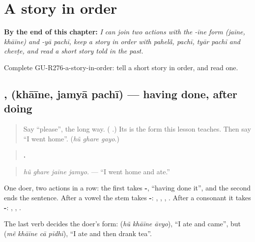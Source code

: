 
\chapter{A story in order}
\label{ch:gu-a-story-in-order}

\begin{chapteropening}
\textbf{By the end of this chapter:} \emph{I can join two actions with the -īne form (jaīne, khāīne) and -yā pachī, keep a story in order with pahelā̃, pachī, tyār pachī and chevṭe, and read a short story told in the past.}

Complete GU-R276-a-story-in-order: tell a short story in order, and read one.
\end{chapteropening}

\section[\texorpdfstring{\gu{ખાઈને} · \gu{જમ્યા} \gu{પછી} (khāīne · jamyā pachī)}{ખાઈને · જમ્યા પછી (khāīne · jamyā pachī)}]{,   (khāīne, jamyā pachī) — having done, after doing}

\label{lesson:GU-C276-khaine}



\begin{quote}
Say \textquotedblleft{}please\textquotedblright{}, the long way. (\textbf{ }.) Its \textbf{} is the form this lesson teaches. Then say \textquotedblleft{}I went home\textquotedblright{}. (\emph{hũ ghare gayo}.)
\end{quote}

\begin{grammarlens}[title={Grammar Lens: the -\gu{ઈને} form}]
\begin{quote}
\textbf{   .}
\end{quote}

\begin{quote}
\emph{hũ ghare jaīne jamyo.} — \textquotedblleft{}I went home and ate.\textquotedblright{}
\end{quote}

One doer, two actions in a row: the first takes \textbf{-}, \textquotedblleft{}having done it\textquotedblright{}, and the second ends the sentence. After a vowel the stem takes \textbf{-}: \textbf{}, \textbf{}, \textbf{}, \textbf{}. After a consonant it takes \textbf{-}: \textbf{}, \textbf{}, \textbf{}.

The last verb decides the doer's form: \textbf{  } (\emph{hũ khāīne āvyo}), \textquotedblleft{}I ate and came\textquotedblright{}, but \textbf{   } (\emph{mẽ khāīne cā pīdhī}), \textquotedblleft{}I ate and then drank tea\textquotedblright{}.
\end{grammarlens}


